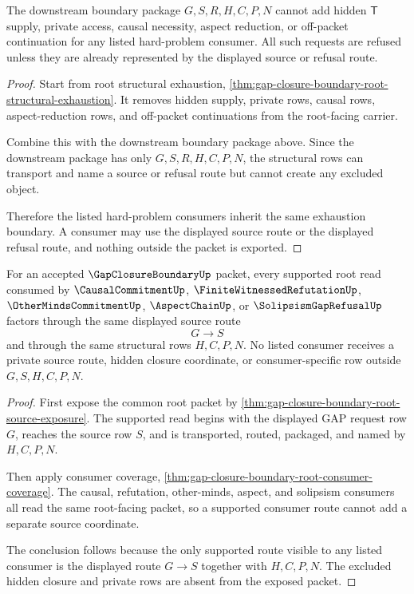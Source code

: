 \begin{theorem}
\label{thm:gap-closure-boundary-downstream-structural-exhaustion}
The downstream boundary package $G,S,R,H,C,P,N$ cannot add hidden $\mathsf{T}$ supply, private access, causal necessity, aspect reduction, or off-packet continuation for any listed hard-problem consumer. All such requests are refused unless they are already represented by the displayed source or refusal route.
\end{theorem}
\begin{proof}
Start from root structural exhaustion, \autoref{thm:gap-closure-boundary-root-structural-exhaustion}. It removes hidden supply, private rows, causal rows, aspect-reduction rows, and off-packet continuations from the root-facing carrier.

Combine this with the downstream boundary package above. Since the downstream package has only $G,S,R,H,C,P,N$, the structural rows can transport and name a source or refusal route but cannot create any excluded object.

Therefore the listed hard-problem consumers inherit the same exhaustion boundary. A consumer may use the displayed source route or the displayed refusal route, and nothing outside the packet is exported.
\end{proof}

\begin{theorem}\label{thm:gap-closure-boundary-source-consumer-uniformity}
For an accepted $\GapClosureBoundaryUp$ packet, every supported root read consumed by $\CausalCommitmentUp$, $\FiniteWitnessedRefutationUp$, $\OtherMindsCommitmentUp$, $\AspectChainUp$, or $\SolipsismGapRefusalUp$ factors through the same displayed source route
$$
G \longrightarrow S
$$
and through the same structural rows $H,C,P,N$. No listed consumer receives a private source route, hidden closure coordinate, or consumer-specific row outside $G,S,H,C,P,N$.
\end{theorem}
\begin{proof}
First expose the common root packet by \autoref{thm:gap-closure-boundary-root-source-exposure}. The supported read begins with the displayed GAP request row $G$, reaches the source row $S$, and is transported, routed, packaged, and named by $H,C,P,N$.

Then apply consumer coverage, \autoref{thm:gap-closure-boundary-root-consumer-coverage}. The causal, refutation, other-minds, aspect, and solipsism consumers all read the same root-facing packet, so a supported consumer route cannot add a separate source coordinate.

The conclusion follows because the only supported route visible to any listed consumer is the displayed route $G \longrightarrow S$ together with $H,C,P,N$. The excluded hidden closure and private rows are absent from the exposed packet.
\end{proof}

